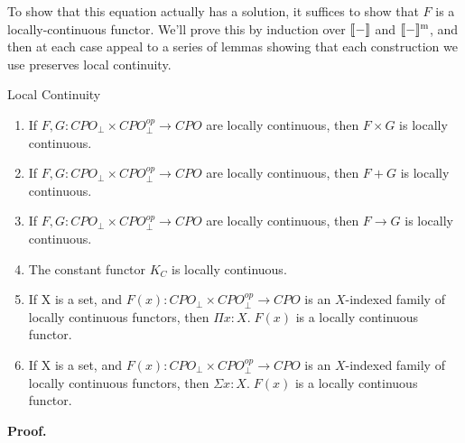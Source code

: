 \documentclass[12pt]{article}
\begin{document}
To show that this equation actually has a solution, it suffices to 
show that $F$ is a locally-continuous functor. We'll prove this by 
induction over $[\![{-}]\!]$ and $[\![{-}]\!]^{\mathrm{m}}$, and then at each
case appeal to a series of lemmas showing that each construction we
use preserves local continuity. 


\begin{lemma}{Local Continuity}
\begin{enumerate}
\item If $F,G : CPO_\bot \times CPO^{op}_\bot \to CPO$ are locally continuous,
      then $F \times G$ is locally continuous.  
\item If $F,G : CPO_\bot \times CPO^{op}_\bot \to CPO$ are locally continuous,
      then $F + G$ is locally continuous.  
\item If $F,G : CPO_\bot \times CPO^{op}_\bot \to CPO$ are locally continuous,
      then $F \to G$ is locally continuous.  
\item The constant functor $K_C$ is locally continuous. 
\item If X is a set, and $F(x) : CPO_\bot \times CPO^{op}_\bot \to CPO$ is an
      $X$-indexed family of locally continuous functors, then 
      $\Pi x:X.\;F(x)$ is a locally continuous functor. 
\item If X is a set, and $F(x) : CPO_\bot \times CPO^{op}_\bot \to CPO$ is an
      $X$-indexed family of locally continuous functors, then 
      $\Sigma x:X.\;F(x)$ is a locally continuous functor. 
\end{enumerate}
\end{lemma}
 
\textbf{Proof.}
\end{document}
